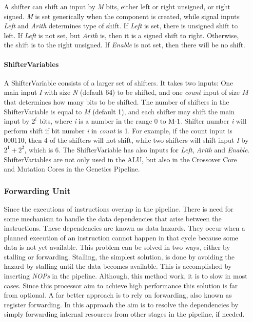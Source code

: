 A shifter can shift an input by \emph{M} bits, either left or right unsigned, or right signed. \emph{M} is set generically when the component is created, while signal inputs  \emph{Left} and \emph{Arith} determines type of shift. 
If \emph{Left} is set, there is unsigned shift to left.
If \emph{Left} is not set, but \emph{Arith} is, then it is a signed shift to right.
Otherwise, the shift is to the right unsigned.
If \emph{Enable} is not set, then there will be no shift.

\paragraph{ShifterVariables}
A ShifterVariable consists of a larger set of shifters. 
It takes two inputs: One main input \emph{I} with size \emph{N} (default 64) to be shifted, and one \emph{count} input of size \emph{M} that determines how many bits to be shifted. 
The number of shifters in the ShifterVariable is equal to \emph{M} (default 1), and each shifter may shift the main input by $2^i$ bits, where \emph{i} is a number in the range 0 to M-1. 
Shifter number \emph{i} will perform shift if bit number \emph{i} in \emph{count} is 1. 
For example, if the count input is 000110, then 4 of the shifters will not shift, while two shifters will shift input \emph{I} by $2^1 + 2^2$, which is 6.
The ShifterVariable has also inputs for \emph{Left}, \emph{Arith} and \emph{Enable}.
ShifterVariables are not only used in the ALU, but also in the Crossover Core and Mutation Cores in the Genetics Pipeline.



\subsubsection{Forwarding Unit} \label{fpga:fitness:sss:forwarding_unit}
Since the executions of instructions overlap in the pipeline.
There is need for some mechanism to handle the data dependencies that arise between the instructions. These dependencies are known as data hazards. They occur when a planned execution of an instruction cannot happen in that cycle because some data is not yet available. This problem can be solved in two ways, either by stalling or forwarding. Stalling, the simplest solution, is done by avoiding the hazard by stalling until the data becomes available. This is accomplished by inserting \emph{NOPs} in the pipeline. Although, this method work, it is to slow in most cases. Since this processor aim to achieve high performance this solution is far from optional. A far better approach is to rely on forwarding, also known as register forwarding. In this approach the aim is to resolve the dependencies by simply forwarding internal resources from other stages in the pipeline, if needed.


